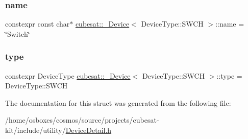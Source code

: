 \subsubsection{\texorpdfstring{name}{name}}
{\footnotesize\ttfamily constexpr const char$\ast$ \hyperlink{structcubesat_1_1__Device}{cubesat\+::\+\_\+\+Device}$<$ Device\+Type\+::\+S\+W\+CH $>$\+::name = \char`\"{}Switch\char`\"{}\hspace{0.3cm}{\ttfamily [static]}}

\mbox{\label{structcubesat_1_1__Device_3_01DeviceType_1_1SWCH_01_4_ad84fb11f2962d2967eb8f8e863d31ee9}} 
\subsubsection{\texorpdfstring{type}{type}}
{\footnotesize\ttfamily constexpr Device\+Type \hyperlink{structcubesat_1_1__Device}{cubesat\+::\+\_\+\+Device}$<$ Device\+Type\+::\+S\+W\+CH $>$\+::type = Device\+Type\+::\+S\+W\+CH\hspace{0.3cm}{\ttfamily [static]}}



The documentation for this struct was generated from the following file\+:\begin{DoxyCompactItemize}
\item 
/home/osboxes/cosmos/source/projects/cubesat-\/kit/include/utility/\hyperlink{DeviceDetail_8h}{Device\+Detail.\+h}\end{DoxyCompactItemize}
